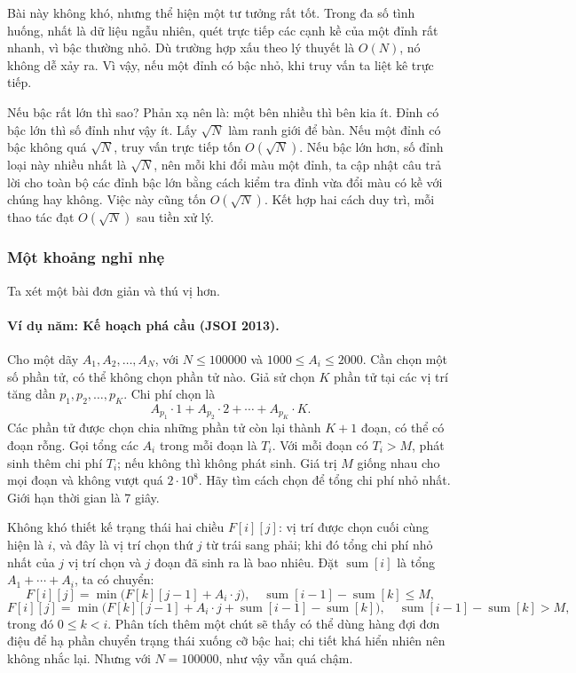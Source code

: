 \documentclass[11pt]{article}
\begin{document}
Bài này không khó, nhưng thể hiện một tư tưởng rất tốt. Trong đa số tình huống,
nhất là dữ liệu ngẫu nhiên, quét trực tiếp các cạnh kề của một đỉnh rất nhanh,
vì bậc thường nhỏ. Dù trường hợp xấu theo lý thuyết là \(O(N)\), nó không dễ
xảy ra. Vì vậy, nếu một đỉnh có bậc nhỏ, khi truy vấn ta liệt kê trực tiếp.

Nếu bậc rất lớn thì sao? Phản xạ nên là: một bên nhiều thì bên kia ít. Đỉnh có
bậc lớn thì số đỉnh như vậy ít. Lấy \(\sqrt N\) làm ranh giới để bàn. Nếu một
đỉnh có bậc không quá \(\sqrt N\), truy vấn trực tiếp tốn \(O(\sqrt N)\). Nếu
bậc lớn hơn, số đỉnh loại này nhiều nhất là \(\sqrt N\), nên mỗi khi đổi màu
một đỉnh, ta cập nhật câu trả lời cho toàn bộ các đỉnh bậc lớn bằng cách kiểm
tra đỉnh vừa đổi màu có kề với chúng hay không. Việc này cũng tốn
\(O(\sqrt N)\). Kết hợp hai cách duy trì, mỗi thao tác đạt \(O(\sqrt N)\) sau
tiền xử lý.

\subsubsection{Một khoảng nghỉ nhẹ}

Ta xét một bài đơn giản và thú vị hơn.

\paragraph{Ví dụ năm: Kế hoạch phá cầu (JSOI 2013).}
Cho một dãy \(A_1,A_2,\ldots,A_N\), với \(N\le100000\) và
\(1000\le A_i\le2000\). Cần chọn một số phần tử, có thể không chọn phần tử nào.
Giả sử chọn \(K\) phần tử tại các vị trí tăng dần
\(p_1,p_2,\ldots,p_K\). Chi phí chọn là
\[
  A_{p_1}\cdot 1+A_{p_2}\cdot 2+\cdots+A_{p_K}\cdot K.
\]
Các phần tử được chọn chia những phần tử còn lại thành \(K+1\) đoạn, có thể có
đoạn rỗng. Gọi tổng các \(A_i\) trong mỗi đoạn là \(T_i\). Với mỗi đoạn có
\(T_i>M\), phát sinh thêm chi phí \(T_i\); nếu không thì không phát sinh. Giá
trị \(M\) giống nhau cho mọi đoạn và không vượt quá \(2\cdot10^8\). Hãy tìm
cách chọn để tổng chi phí nhỏ nhất. Giới hạn thời gian là 7 giây.

Không khó thiết kế trạng thái hai chiều \(F[i][j]\): vị trí được chọn cuối
cùng hiện là \(i\), và đây là vị trí chọn thứ \(j\) từ trái sang phải; khi đó
tổng chi phí nhỏ nhất của \(j\) vị trí chọn và \(j\) đoạn đã sinh ra là bao
nhiêu. Đặt \(\operatorname{sum}[i]\) là tổng \(A_1+\cdots+A_i\), ta có chuyển:
\[
  F[i][j]=\min\bigl(F[k][j-1]+A_i\cdot j\bigr),
  \quad \operatorname{sum}[i-1]-\operatorname{sum}[k]\le M,
\]
\[
  F[i][j]=\min\bigl(F[k][j-1]+A_i\cdot j
      +\operatorname{sum}[i-1]-\operatorname{sum}[k]\bigr),
  \quad \operatorname{sum}[i-1]-\operatorname{sum}[k]>M,
\]
trong đó \(0\le k<i\). Phân tích thêm một chút sẽ thấy có thể dùng hàng đợi
đơn điệu để hạ phần chuyển trạng thái xuống cỡ bậc hai; chi tiết khá hiển nhiên
nên không nhắc lại. Nhưng với \(N=100000\), như vậy vẫn quá chậm.
\end{document}
